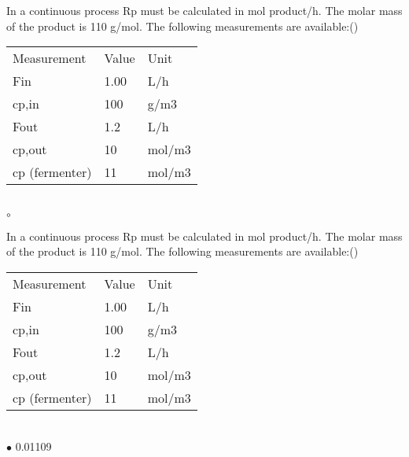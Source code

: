 \documentclass[]{beamer}
\begin{document}
\begin{frame}[shrink] {}
\addtocounter{questions}{1}
\color{blue}
In a continuous process Rp must be calculated in mol product/h. The molar mass of the product is 110 g/mol. The following measurements are available:({})\\[0.3em]
\color{gray}
\begin{tabular}[]{l l l}
Measurement & Value & Unit\\
Fin & 1.00 & L/h\\
cp,in& 	100& 	g/m3\\
Fout& 	1.2& 	L/h\\
cp,out&  	10 & 	mol/m3\\
cp (fermenter) & 11 & 	mol/m3\\
\end{tabular}\\[0.3em]
\color{black}
\setlength{\parindent}{-0.4cm}
{\color{red}$\circ$} \\

\end{frame}
\begin{frame}[shrink] {}
\addtocounter{answers}{1}
\color{blue}
In a continuous process Rp must be calculated in mol product/h. The molar mass of the product is 110 g/mol. The following measurements are available:({})\\[0.3em]
\color{gray}
\begin{tabular}[]{l l l}
Measurement & Value & Unit\\
Fin & 1.00 & L/h\\
cp,in& 	100& 	g/m3\\
Fout& 	1.2& 	L/h\\
cp,out&  	10 & 	mol/m3\\
cp (fermenter) & 11 & 	mol/m3\\
\end{tabular}\\[0.3em]
\color{black}
\setlength{\parindent}{-0.4cm}
{\color{red}$\bullet$} 0.01109

\end{frame}
\end{document}
